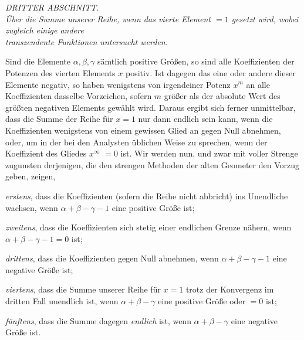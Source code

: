 \par{}\begin{center}
\textit{DRITTER ABSCHNITT.}\\[6pt]
\textit{Über die Summe unserer Reihe, wenn das vierte Element $=1$ gesetzt wird, wobei zugleich einige andere}\\
\textit{transzendente Funktionen untersucht werden.}\\[6pt]
\end{center}

Sind die Elemente $\alpha,\beta,\gamma$ sämtlich positive Größen, so sind alle Koeffizienten der Potenzen des vierten Elements $x$ positiv. Ist dagegen das eine oder andere dieser Elemente negativ, so haben wenigstens von irgendeiner Potenz $x^m$ an alle Koeffizienten dasselbe Vorzeichen, sofern $m$ größer als der absolute Wert des größten negativen Elements gewählt wird. Daraus ergibt sich ferner unmittelbar, dass die Summe der Reihe für
$x=1$ nur dann endlich sein kann, wenn die Koeffizienten wenigstens von einem gewissen Glied an gegen Null abnehmen, oder, um in der bei den Analysten üblichen Weise zu sprechen, wenn der Koeffizient des Gliedes $x^{\infty}$ $=0$ ist. Wir werden nun, und zwar mit voller Strenge zugunsten derjenigen, die den strengen Methoden der alten Geometer den Vorzug geben, zeigen,

\textit{erstens}, dass die Koeffizienten (sofern die Reihe nicht abbricht) ins Unendliche wachsen, wenn $\alpha+\beta-\gamma-1$ eine positive Größe ist;

\textit{zweitens}, dass die Koeffizienten sich stetig einer endlichen Grenze nähern, wenn $\alpha+\beta-\gamma-1=0$ ist;

\textit{drittens}, dass die Koeffizienten gegen Null abnehmen, wenn $\alpha+\beta-\gamma-1$ eine negative Größe ist;

\textit{viertens}, dass die Summe unserer Reihe für $x=1$ trotz der Konvergenz im dritten Fall unendlich ist, wenn $\alpha+\beta-\gamma$ eine positive Größe oder $=0$ ist;

\textit{fünftens}, dass die Summe dagegen \textit{endlich} ist, wenn $\alpha+\beta-\gamma$ eine negative Größe ist.

